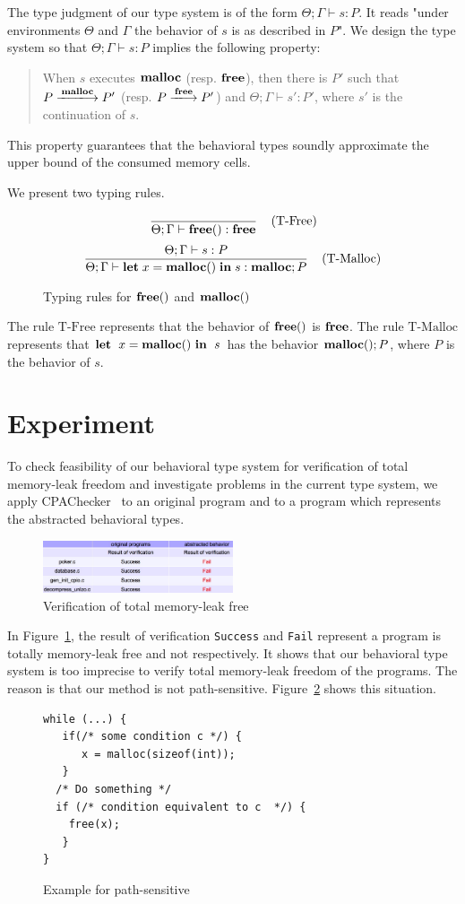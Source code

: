 \documentclass{sigplanconf}
\begin{document}
The type judgment of our type system is of the form $\Theta;\Gamma\vdash s :
P$.  It reads "under environments \(\Theta\) and  \(\Gamma\) the behavior
of \(s\) is as described in \(P\)".  We design the type system so that
\(\Theta;\Gamma \vdash s : P\) implies the following property:
\begin{quotation}
  When \(s\) executes \(\mathbf{malloc}\) (resp. \(\mathbf{free}\)), then there is
  \(P'\) such that \(P\xlongrightarrow{\Malloc} P'\)
  (resp. \(P\xlongrightarrow{\Free}P'\)) and \(\Theta;\Gamma \vdash s'
  : P'\), where \(s'\) is the continuation of \(s\).
\end{quotation}
This property guarantees that the behavioral types soundly
approximate the upper bound of the consumed memory cells.

We present two typing rules. 
\begin{figure}[t]
$$ \frac{}
{\Theta;\Gamma \vdash \mathbf{free}() : \mathbf{free}} 
\; \; \; \; \mbox{(T-Free)} $$
$$ \frac{\Theta;\Gamma \vdash s : P}
{\Theta;\Gamma \vdash \mathbf{let}\; x = \mathbf{malloc()} \; \mathbf{in}\; s  : \mathbf{malloc};P} 
\; \; \; \; \mbox{(T-Malloc)} $$
\caption{Typing rules for $\mathbf{free}()$ and $\mathbf{malloc()}$ }
\end{figure}
The rule $\mbox{T-Free}$ represents that the behavior of \(\mathbf{free}()\)
is \(\mathbf{free}\). The rule $\mbox{T-Malloc}$ represents that \(\mathbf{let}\;\ x =
\mathbf{malloc()}\ \mathbf{in}\;\ s\) has the behavior \(\mathbf{malloc()};P\), where \(P\) is the
behavior of \(s\).

\section{Experiment}
To check feasibility of our behavioral type system for verification of
total memory-leak freedom and investigate problems in the current type
system, we apply CPAChecker~\cite{beyer2011cpachecker} to an original
program and to a program which represents the abstracted behavioral
types.

\begin{figure}[!hbp]
\centering \includegraphics[width=0.5\textwidth]{exp.png}
\caption{Verification of total memory-leak free}
\label{figexp} 
\end{figure}

In Figure~\ref{figexp}, the result of verification \texttt{Success}
and \texttt{Fail} represent a program is totally memory-leak free and
not respectively. It shows that our behavioral type system is too
imprecise to verify total memory-leak freedom of the programs. The
reason is that our method is not path-sensitive. Figure~\ref{ex:fail}
shows this situation.
\begin{figure}[h]
\begin{verbatim}
while (...) {
   if(/* some condition c */) {
      x = malloc(sizeof(int));
   }
  /* Do something */
  if (/* condition equivalent to c  */) {
    free(x);
   }
}
\end{verbatim}
\caption{Example for path-sensitive}
\label{ex:fail}
\end{figure}
\end{document}
